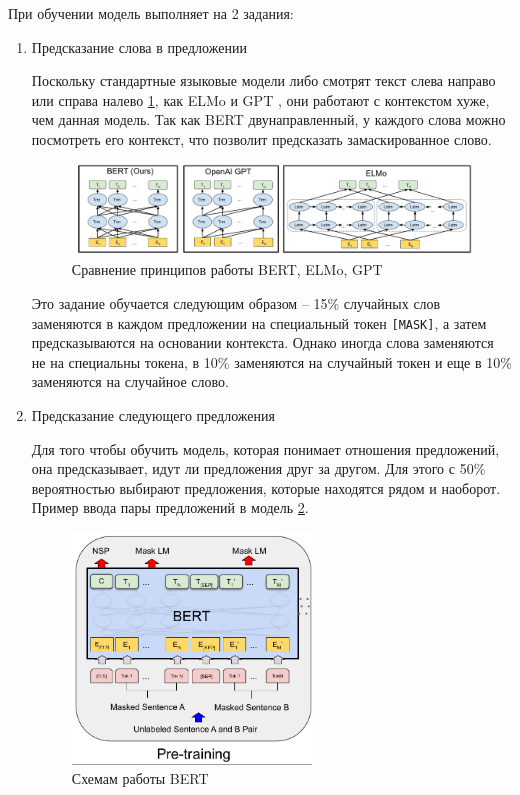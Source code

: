 \documentclass[PI, VKR]{HSEUniversity}
\begin{document}
При обучении модель выполняет на 2 задания:
\begin{enumerate}
\item Предсказание слова в предложении

Поскольку стандартные языковые модели либо смотрят текст слева направо или справа налево \ref{fig:BERT_comparisons}, как ELMo \autocite{elmo} и GPT \autocite{radford2019language}, они работают с контекстом хуже, чем данная модель. Так как BERT двунаправленный, у каждого слова можно посмотреть его контекст, что позволит предсказать замаскированное слово.

\begin{figure}[h]
\centering
\includegraphics[width=.9\linewidth]{img/BERT_comparisons.pdf}
\caption{\label{fig:BERT_comparisons}Сравнение принципов работы BERT, ELMo, GPT}
\end{figure}

Это задание обучается следующим образом -- 15\% случайных слов заменяются в каждом предложении на специальный токен \texttt{[MASK]}, а затем предсказываются на основании контекста. Однако иногда слова заменяются не на специальны токена, в 10\% заменяются на случайный токен и еще в 10\% заменяются на случайное слово.

\item Предсказание следующего предложения

Для того чтобы обучить модель, которая понимает отношения предложений, она предсказывает, идут ли предложения друг за другом. Для этого с 50\% вероятностью выбирают предложения, которые находятся рядом и наоборот. Пример ввода пары предложений в модель \ref{fig:bert_pretrainin}.

\begin{figure}[!hbp]
\centering
\includegraphics[width=0.6\textwidth]{img/bert_pretrainin.png}
\caption{\label{fig:bert_pretrainin}Схемам работы BERT}
\end{figure}
\end{enumerate}
\end{document}
